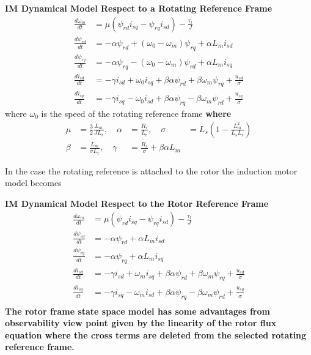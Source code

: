 \documentclass[11pt,a4paper,oneside]{book}
\numberwithin{equation}{section}
\theoremstyle{it}
\theoremstyle{definition}
\begin{document}
\begin{mybox}
	\textbf{IM Dynamical Model Respect to a Rotating Reference Frame}
	\begin{equation}\label{im_eq_41}
		\begin{aligned}
			\frac{d\omega_m}{dt} &= \mu \left(\psi_{rd}i_{sq} - 
			\psi_{rq}i_{sd}\right)-\frac{\tau_l}{J} \\[6pt]
			\frac{d\psi_{rd}}{dt} &= -\alpha \psi_{rd} 
			+\left(\omega_0-\omega_m\right) \psi_{rq}+ \alpha L_m i_{sd} \\[6pt]
			\frac{d\psi_{rq}}{dt} &= -\alpha 
			\psi_{rq}-\left(\omega_0-\omega_m\right) \psi_{rd}+\alpha L_m 
			i_{sq} \\[6pt]
			\frac{di_{sd}}{dt} &= -\gamma i_{sd}  + \omega_0 i_{sq} + 
			\beta\alpha\psi_{rd}+\beta\omega_m\psi_{rq} + \frac{u_{sd}}{\sigma} 
			\\[6pt]
			\frac{di_{sq}}{dt} &= -\gamma i_{sq}  - \omega_0 i_{sd} + 
			\beta\alpha\psi_{rq}-\beta\omega_m\psi_{rd} + \frac{u_{sq}}{\sigma}
		\end{aligned}
	\end{equation}
	where $\omega_0$ is the speed of the rotating reference frame
	\textbf{where}
	\begin{equation}\label{im_eq_42}
		\begin{aligned}
			\mu & = \frac{3}{2}\frac{L_m}{JL_r}, \quad
			\alpha & = \frac{R_r}{L_r},  \quad
			\sigma & = L_s \left(1-\frac{L_m^2}{L_sL_r}\right) \\[6pt]
			\beta & = \frac{L_m}{\sigma L_r},  \quad
			\gamma & = \frac{R_s}{\sigma} + \beta \alpha L_m
		\end{aligned}
	\end{equation}
\end{mybox}

In the case the rotating reference is attached to the rotor the induction motor 
model becomes
\begin{mybox}
	\textbf{IM Dynamical Model Respect to the Rotor Reference Frame}
	\begin{equation}\label{im_eq_43}
		\begin{aligned}
			\frac{d\omega_m}{dt} &= \mu \left(\psi_{rd}i_{sq} - 
			\psi_{rq}i_{sd}\right)-\frac{\tau_l}{J} \\[6pt]
			\frac{d\psi_{rd}}{dt} &= -\alpha \psi_{rd} + \alpha L_m i_{sd} 
			\\[6pt]
			\frac{d\psi_{rq}}{dt} &= -\alpha \psi_{rq} + \alpha L_m i_{sq} 
			\\[6pt]
			\frac{di_{sd}}{dt} &= -\gamma i_{sd}  + \omega_m i_{sq} + 
			\beta\alpha\psi_{rd}+\beta\omega_m\psi_{rq} + \frac{u_{sd}}{\sigma} 
			\\[6pt]
			\frac{di_{sq}}{dt} &= -\gamma i_{sq}  - \omega_m i_{sd} + 
			\beta\alpha\psi_{rq}-\beta\omega_m\psi_{rd} + \frac{u_{sq}}{\sigma} 
			\\[6pt]
		\end{aligned}
	\end{equation}
	\textbf{The rotor frame state space model has some advantages from 
		observability view point given by the linearity of the rotor flux 
		equation 
		where the cross terms are deleted from the selected rotating reference 
		frame.}
\end{mybox}
\end{document}
